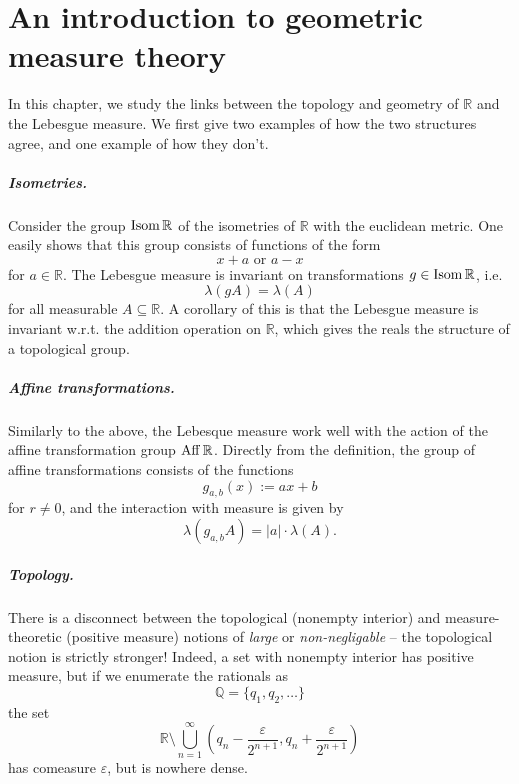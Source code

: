 \chapter{An introduction to geometric measure theory }

In this chapter, we study the links between the topology and geometry of \( \mathbb{R} \) and the Lebesgue measure. We first give two examples of how the two structures agree, and one example of how they don't.

\paragraph{Isometries.} Consider the group \( \operatorname{Isom} \mathbb{R} \) of the isometries of \( \mathbb{R} \) with the euclidean metric. One easily shows that this group consists of functions of the form
\[ 
    x + a \text{ or } a-x
\]
for \( a \in \mathbb{R} \). The Lebesgue measure is invariant on transformations \( g \in \operatorname{Isom} \mathbb{R} \), i.e.
\[ 
    \lambda(gA) =\lambda(A)
\]
for all measurable \( A \subseteq \mathbb{R} \). A corollary of this is that the Lebesgue measure is invariant w.r.t. the addition operation on \( \mathbb{R} \), which gives the reals the structure of a topological group.

\paragraph{Affine transformations.} Similarly to the above, the Lebesque measure work well with the action of the affine transformation group \( \operatorname{Aff} \mathbb{R} \). Directly from the definition, the group of affine transformations consists of the functions
\[ 
    g_{a, b} (x) := ax + b
\]
for \( r \neq 0 \), and the interaction with measure is given by
\[ 
    \lambda( g_{a,b} A ) = \lvert a \rvert \cdot \lambda( A ) .
\]

\paragraph{Topology.} There is a disconnect between the topological (nonempty interior) and measure-theoretic (positive measure) notions of \emph{large} or \emph{non-negligable} -- the topological notion is strictly stronger! Indeed, a set with nonempty interior has positive measure, but if we enumerate the rationals as
\[ 
    \mathbb{Q} = \{ q_1, q_2, \ldots \}
\]
the set
\[ 
    \mathbb{R} \setminus \bigcup_{n=1}^\infty (q_n - \frac{\varepsilon}{2^{n+1}},q_n + \frac{\varepsilon}{2^{n+1}} )  
\]
has comeasure \( \varepsilon \), but is nowhere dense.


